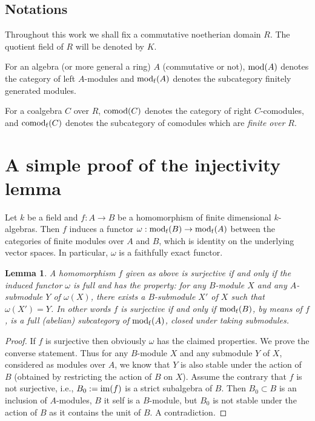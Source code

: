 \documentclass[12pt]{amsart}
\theoremstyle{plain}
\newtheorem{lem}[thm]{Lemma}
\theoremstyle{definition}
\numberwithin{thm}{section}
\def\mod{{\rm mod}}
\def\comod{{\rm comod}}
\begin{document}
\subsection*{Notations}Throughout this work we shall fix a commutative noetherian domain $R$. The quotient field of $R$ will be denoted by $K$. 

For an algebra (or more general a ring) $A$ (commutative or not), ${\rm mod}(A)$ denotes the category of left $A$-modules and $\mod_{\rm f}(A)$ denotes the subcategory finitely generated modules. 

 
For a coalgebra $C$ over  $R$, ${\rm comod}(C)$ denotes the category of right $C$-comodules, and $\comod_{\rm f}(C)$ denotes the subcategory of comodules which are {\em finite over $R$}.




\section{A simple proof of the injectivity lemma} \label{sect1}
Let $k$ be a field and $f:A\to B$ be a 
homomorphism of finite dimensional $k$-algebras. 
Then $f$ induces a functor $\omega:
\mod_{\rm f}(B)\to\mod_{\rm f}(A)$ between the categories of 
finite modules over $A$ and $B$, which is 
identity on the underlying vector spaces. In 
particular, $\omega$ is a faithfully exact functor.



\begin{lem}\label{lem1} A homomorphism $f$ 
given as above is surjective if and only if the 
induced functor $\omega$ is full and has the 
property: for any $B$-module $X$ and any $A$-submodule $Y$ of $\omega(X)$, there exists a 
$B$-submodule $X'$ of $X$ such that 
$\omega(X')=Y$. In other words $f$ is surjective 
if and only if $\mod_{\rm f}(B)$, by means of $f$, is a 
full (abelian) subcategory of $\mod_{\rm f}(A)$, closed under 
taking submodules.\end{lem}

\begin{proof}

If $f$ is surjective then obviously $\omega$ has 
the claimed properties. We prove the converse 
statement. Thus for any $B$-module $X$ and 
any submodule $Y$ of $X$, considered as 
modules over $A$, we know that $Y$ is also 
stable under the action of $B$ (obtained by 
restricting the action of $B$ on $X$). Assume the 
contrary that $f$ is not surjective, i.e.,
$B_0:={\rm im} (f)$ is a strict subalgebra of 
$B$. Then $B_0\subset B$ is an inclusion of $A$-modules, $B$ it self is a $B$-module, but $B_0$ is not stable under the action of $B$ as it contains the unit of $B$. A contradiction.
\end{proof}
\end{document}
